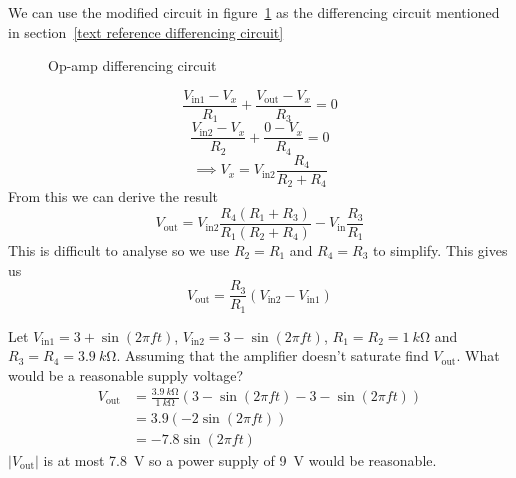 \documentclass{article}
\begin{document}
    We can use the modified circuit in figure~\ref{fig:op-amp differencing circuit} as the differencing circuit mentioned in section~\ref{text reference differencing circuit}
    
    \begin{figure}[ht]
        \centering
        \caption{Op-amp differencing circuit}
        \label{fig:op-amp differencing circuit}
    \end{figure}
    
    \[\frac{V_\text{in1}-V_x}{R_1} + \frac{V_\text{out}-V_x}{R_3} = 0\]
    \[\frac{V_\text{in2}-V_x}{R_2} + \frac{0 - V_x}{R_4} = 0\]
    \[\implies V_x = V_\text{in2}\frac{R_4}{R_2 + R_4}\]
    From this we can derive the result
    \[V_\text{out}=V_\text{in2}\frac{R_4(R_1+R_3)}{R_1(R_2+R_4)} - V_\text{in}\frac{R_3}{R_1}\]
    This is difficult to analyse so we use \(R_2=R_1\) and \(R_4=R_3\) to simplify. This gives us
    \[V_\text{out} = \frac{R_3}{R_1}(V_\text{in2} - V_\text{in1})\]
    
    \begin{example}
        Let \(V_\text{in1} = 3 + \sin(2\pi ft)\), \(V_\text{in2} = 3 - \sin(2\pi ft)\),  \(R_1=R_2=\SI{1}{k\ohm}\) and \(R_3=R_4=\SI{3.9}{k\ohm}\). 
        Assuming that the amplifier doesn't saturate find \(V_\text{out}\). 
        What would be a reasonable supply voltage?
        \begin{align*}
            V_\text{out} &= \frac{\SI{3.9}{k\ohm}}{\SI{1}{k\ohm}}(3 - \sin(2\pi ft) - 3 - \sin(2\pi ft))\\
            &= 3.9(-2\sin(2\pi ft))\\
            &= -7.8\sin(2\pi ft)
        \end{align*}
        \(|V_\text{out}|\) is at most \SI{7.8}{V} so a power supply of \SI{9}{V} would be reasonable.
    \end{example}
\end{document}
